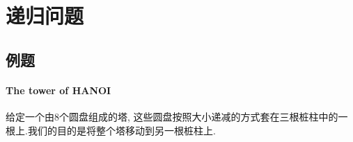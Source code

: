 \chapter{递归问题}

\section{例题}
\label{sec:例题}

\subsubsection{The tower of HANOI}

给定一个由8个圆盘组成的塔, 这些圆盘按照大小递减的方式套在三根桩柱中的一根上.我们的目的是将整个塔移动到另一根桩柱上.



\
